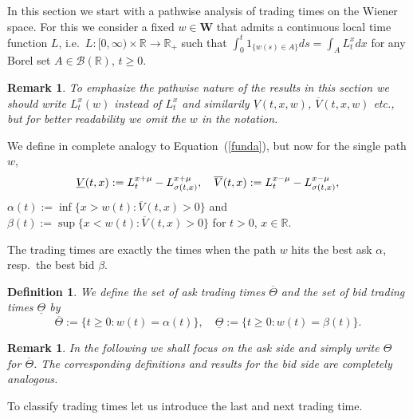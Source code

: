 \documentclass[11pt]{scrartcl}
\newtheorem{definition}[theorem]{Definition}
\newtheorem{remark}[theorem]{Remark}
\begin{document}
\label{s:tradingtimes} 
In this section we start with a pathwise analysis of trading times on the
Wiener space. For this we consider a fixed $w\in \mathbf{W}$ that admits a continuous local
time function $L$, i.e.\ $L:[0,\infty )\times \mathbb{R}\rightarrow \mathbb{R}_{+}$
such that $\int_{0}^{t}1_{\{w(s)\in A\}}ds=\int_{A}L_{t}^{x}dx$ for any
Borel set $A\in \mathcal{B}(\mathbb{R})$, $t\geq 0$. 
\begin{remark}
To emphasize the pathwise nature of the results in this section 
we should write $L_t^x(w)$ instead of $L_t^x$
and similarily $\underline{V}(t,x,w)$, $\overline{V}(t,x,w)$ etc., but for better
readability we omit the $w$ in the notation.
\end{remark}
We define in complete analogy to
Equation~(\ref{funda}), but now for the single path $w$, 
\begin{equation}
\underline{V}(t,x):=L_{t}^{x+\mu }-L_{\sigma (t,x)}^{x+\mu },\quad \overline{%
V}(t,x):=L_{t}^{x-\mu }-L_{\sigma (t,x)}^{x-\mu },
\end{equation}%
$\alpha (t):=\inf \{x>w(t):\overline{V}(t,x)>0\}$ and $\beta (t):=\sup
\{x<w(t):\overline{V}(t,x)>0\}$ for $t>0$, $x\in \mathbb{R}$.

The trading times are exactly the times when the path $w$ hits the best ask $%
\alpha$, resp.\ the best bid $\beta$.

\begin{definition}
\label{trading time points} We define the set of \emph{ask} \emph{trading
times} $\overline{\Theta }$ and the set of \emph{bid trading times} $%
\underline{\Theta }$ by 
\begin{equation}
\overline{\Theta }:=\{t\geq 0:w(t)=\alpha (t)\},\quad \underline{\Theta }%
:=\{t\geq 0:w(t)=\beta (t)\}.
\end{equation}
\end{definition}

\begin{remark}
In the following we shall focus on the ask side and simply write $\Theta$
for $\overline\Theta$. The corresponding definitions and results for the bid
side are completely analogous.
\end{remark}

To classify trading times let us introduce the last and next trading time.
\end{document}
